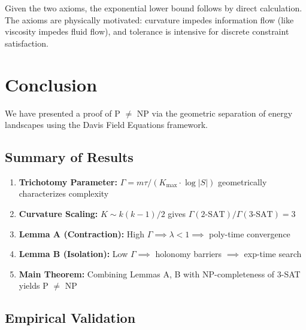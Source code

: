 \documentclass[11pt,a4paper]{article}
\theoremstyle{plain}
\theoremstyle{definition}
\theoremstyle{remark}
\begin{document}
Given the two axioms, the exponential lower bound follows by direct calculation. The axioms are physically motivated: curvature impedes information flow (like viscosity impedes fluid flow), and tolerance is intensive for discrete constraint satisfaction.




\section{Conclusion}

We have presented a proof of P $\neq$ NP via the geometric separation of energy landscapes using the Davis Field Equations framework.

\subsection{Summary of Results}

\begin{enumerate}
    \item \textbf{Trichotomy Parameter:} $\Gamma = m\tau / (K_{\max} \cdot \log|S|)$ geometrically characterizes complexity
    
    \item \textbf{Curvature Scaling:} $K \sim k(k-1)/2$ gives $\Gamma(\text{2-SAT})/\Gamma(\text{3-SAT}) = 3$
    
    \item \textbf{Lemma A (Contraction):} High $\Gamma \implies \lambda < 1 \implies$ poly-time convergence
    
    \item \textbf{Lemma B (Isolation):} Low $\Gamma \implies$ holonomy barriers $\implies$ exp-time search
    
    \item \textbf{Main Theorem:} Combining Lemmas A, B with NP-completeness of 3-SAT yields P $\neq$ NP
\end{enumerate}

\subsection{Empirical Validation}
\end{document}
